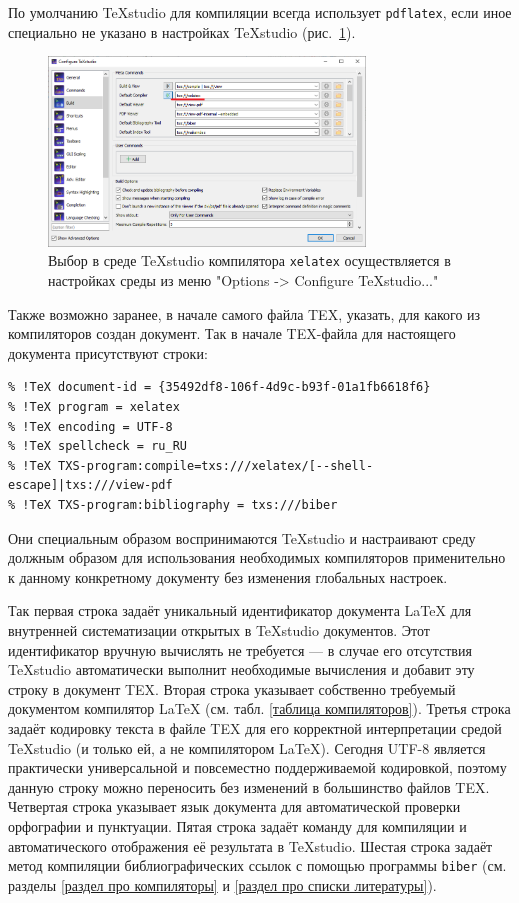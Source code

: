 \documentclass[workbook]{fefudoc}
\begin{document}
По умолчанию TeXstudio для компиляции всегда использует \texttt{pdflatex}, если иное специально не указано в настройках TeXstudio (рис.~\ref{texstudio-options}).
\begin{figure}
\centering
\includegraphics[width=0.75\textwidth]{workbook-extras/texstudio-options}
\caption{Выбор в среде TeXstudio компилятора \texttt{xelatex} осуществляется в настройках среды из меню "Options -> Configure TeXstudio..."}
\label{texstudio-options}
\end{figure}

Также возможно заранее, в начале самого файла TEX, указать, для какого из компиляторов создан документ.
Так в начале TEX-файла для настоящего документа присутствуют строки:
\begin{verbatim}
% !TeX document-id = {35492df8-106f-4d9c-b93f-01a1fb6618f6}
% !TeX program = xelatex
% !TeX encoding = UTF-8
% !TeX spellcheck = ru_RU
% !TeX TXS-program:compile=txs:///xelatex/[--shell-escape]|txs:///view-pdf
% !TeX TXS-program:bibliography = txs:///biber
\end{verbatim}

Они специальным образом воспринимаются TeXstudio и настраивают среду должным образом для использования необходимых компиляторов применительно к данному конкретному документу без изменения глобальных настроек.

Так первая строка задаёт уникальный идентификатор документа \LaTeX{} для внутренней систематизации открытых в TeXstudio документов.
Этот идентификатор вручную вычислять не требуется --- в случае его отсутствия TeXstudio автоматически выполнит необходимые вычисления и добавит эту строку в документ TEX.
Вторая строка указывает собственно требуемый документом компилятор \LaTeX{} (см. табл. \ref{таблица компиляторов}).
Третья строка задаёт кодировку текста в файле TEX для его корректной интерпретации средой TeXstudio (и только ей, а не компилятором \LaTeX{}).
Сегодня UTF-8 является практически универсальной и повсеместно поддерживаемой кодировкой, поэтому данную строку можно переносить без изменений в большинство файлов TEX.
Четвертая строка указывает язык документа для автоматической проверки орфографии и пунктуации.
Пятая строка задаёт команду для компиляции и автоматического отображения её результата в TeXstudio.
Шестая строка задаёт метод компиляции библиографических ссылок с помощью программы \texttt{biber} (см. разделы \ref{раздел про компиляторы} и \ref{раздел про списки литературы}).
\end{document}
